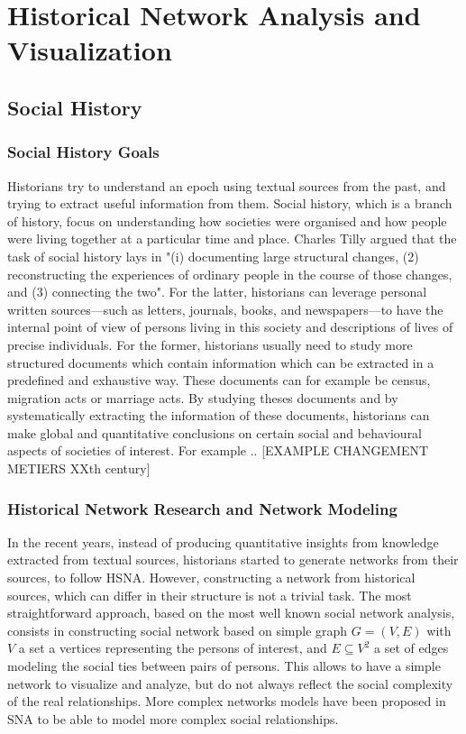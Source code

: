 
\chapter{Historical Network Analysis and Visualization}

\section{Social History}

\subsection{Social History Goals}

Historians try to understand an epoch using textual sources from the past, and trying to extract useful information from them.
Social history, which is a branch of history, focus on understanding how societies were organised and how people were living together at a particular time and place. Charles Tilly argued that the task of social history lays in "(i) documenting large structural changes, (2) reconstructing the experiences of ordinary people in the course of those changes, and (3) connecting the two". For the latter, historians can leverage personal written sources---such as letters, journals, books, and newspapers---to have the internal point of view of persons living in this society and descriptions of lives of precise individuals.
For the former, historians usually need to study more structured documents which contain information which can be extracted in a predefined and exhaustive way. These documents can for example be census, migration acts or marriage acts. By studying theses documents and by systematically extracting the information of these documents, historians can make global and quantitative conclusions on certain social and behavioural aspects of societies of interest.
For example .. [EXAMPLE CHANGEMENT METIERS XXth century]

\subsection{Historical Network Research and Network Modeling}

In the recent years, instead of producing quantitative insights from knowledge extracted from textual sources, historians started to generate networks from their sources, to follow HSNA.
However, constructing a network from historical sources, which can differ in their structure is not a trivial task. The most straightforward approach, based on the most well known social network analysis, consists in constructing social network based on simple graph $G = (V, E)$ with $V$ a set a vertices representing the persons of interest, and $E \subseteq V^2$ a set of edges modeling the social ties between pairs of persons. This allows to have a simple network to visualize and analyze, but do not always reflect the social complexity of the real relationships. More complex networks models have been proposed in SNA to be able to model more complex social relationships.



